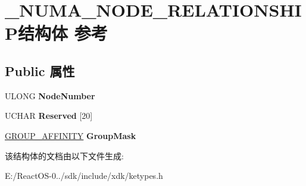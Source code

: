 \hypertarget{struct___n_u_m_a___n_o_d_e___r_e_l_a_t_i_o_n_s_h_i_p}{}\section{\+\_\+\+N\+U\+M\+A\+\_\+\+N\+O\+D\+E\+\_\+\+R\+E\+L\+A\+T\+I\+O\+N\+S\+H\+I\+P结构体 参考}
\label{struct___n_u_m_a___n_o_d_e___r_e_l_a_t_i_o_n_s_h_i_p}
\subsection*{Public 属性}
\begin{DoxyCompactItemize}
\item 
\mbox{\label{struct___n_u_m_a___n_o_d_e___r_e_l_a_t_i_o_n_s_h_i_p_ae7dca36cf501887f463a3485a4c2dd42}} 
U\+L\+O\+NG {\bfseries Node\+Number}
\item 
\mbox{\label{struct___n_u_m_a___n_o_d_e___r_e_l_a_t_i_o_n_s_h_i_p_a63591012c438bfbb93c5dd2cbeb12d63}} 
U\+C\+H\+AR {\bfseries Reserved} \mbox{[}20\mbox{]}
\item 
\mbox{\label{struct___n_u_m_a___n_o_d_e___r_e_l_a_t_i_o_n_s_h_i_p_a4340c132b603cfbfeab4297b032d00bf}} 
\hyperlink{struct___g_r_o_u_p___a_f_f_i_n_i_t_y}{G\+R\+O\+U\+P\+\_\+\+A\+F\+F\+I\+N\+I\+TY} {\bfseries Group\+Mask}
\end{DoxyCompactItemize}


该结构体的文档由以下文件生成\+:\begin{DoxyCompactItemize}
\item 
E\+:/\+React\+O\+S-\/0../sdk/include/xdk/ketypes.\+h\end{DoxyCompactItemize}
